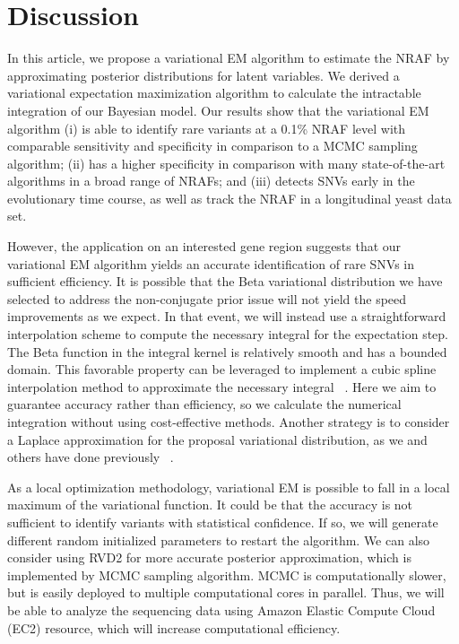 \documentclass[11pt,reqno]{amsart}
\begin{document}
\section{Discussion}
In this article, we propose a variational EM algorithm to estimate the NRAF by approximating posterior distributions for latent variables.
We derived a variational expectation maximization algorithm to calculate the intractable integration of our Bayesian model.
Our results show that the variational EM algorithm
(i) is able to identify rare variants at a 0.1\% NRAF level with comparable sensitivity and specificity in comparison to a MCMC sampling algorithm;
(ii) has a higher specificity in comparison with many state-of-the-art algorithms in a broad range of NRAFs;
and (iii) detects SNVs early in the evolutionary time course, as well as track the NRAF in a longitudinal yeast data set.

However, the application on an interested gene region suggests that our variational EM algorithm yields an accurate identification of rare SNVs in sufficient efficiency.
It is possible that the Beta variational distribution we have selected to address the non-conjugate prior issue will not yield the speed improvements as we expect.
In that event, we will instead use a straightforward interpolation scheme to compute the necessary integral for the expectation step.
The Beta function in the integral kernel is relatively smooth and has a bounded domain.
This favorable property can be leveraged to implement a cubic spline interpolation method to approximate the necessary integral ~\citep{mckinley1998cubic}.
Here we aim to guarantee accuracy rather than efficiency, so we calculate the numerical integration without using cost-effective methods.
Another strategy is to consider a Laplace approximation for the proposal variational distribution, as we and others have done previously ~\citep{saddiki2014glad, wang2013variational}.

As a local optimization methodology, variational EM is possible to fall in a local maximum of the variational function.
It could be that the accuracy is not sufficient to identify variants with statistical confidence.
If so, we will generate different random initialized parameters to restart the algorithm.
We can also consider using RVD2 for more accurate posterior approximation, which is implemented by MCMC sampling algorithm.
MCMC is computationally slower, but is easily deployed to multiple computational cores in parallel.
Thus, we will be able to analyze the sequencing data using Amazon Elastic Compute Cloud (EC2) resource, which will increase computational efficiency.
\end{document}
